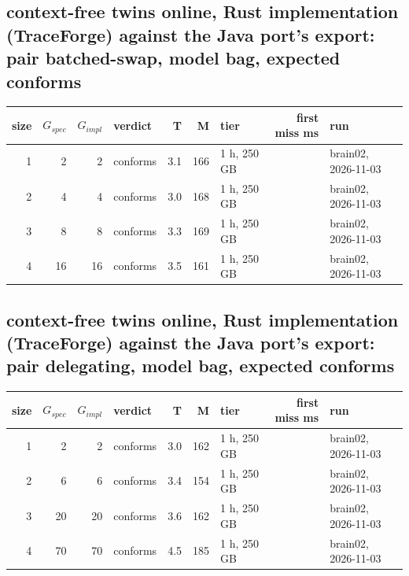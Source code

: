 \documentclass[10pt]{article}
\begin{document}
\subsection*{context-free twins online, Rust implementation (TraceForge) against the Java port's export: pair \textsf{batched-swap}, model bag, expected conforms}
\begin{longtable}{@{}rrrlrrlrl@{}}
\toprule
size & $G_{\mathit{spec}}$ & $G_{\mathit{impl}}$ & verdict & T & M & tier & first miss ms & run \\
\midrule
\endhead
\color{red} 1 & 2 & 2 & conforms & 3.1 & 166 & 1 h, 250 GB &  & brain02, 2026-11-03 \\
\color{red} 2 & 4 & 4 & conforms & 3.0 & 168 & 1 h, 250 GB &  & brain02, 2026-11-03 \\
\color{red} 3 & 8 & 8 & conforms & 3.3 & 169 & 1 h, 250 GB &  & brain02, 2026-11-03 \\
\color{red} 4 & 16 & 16 & conforms & 3.5 & 161 & 1 h, 250 GB &  & brain02, 2026-11-03 \\
\bottomrule
\end{longtable}
\subsection*{context-free twins online, Rust implementation (TraceForge) against the Java port's export: pair \textsf{delegating}, model bag, expected conforms}
\begin{longtable}{@{}rrrlrrlrl@{}}
\toprule
size & $G_{\mathit{spec}}$ & $G_{\mathit{impl}}$ & verdict & T & M & tier & first miss ms & run \\
\midrule
\endhead
\color{red} 1 & 2 & 2 & conforms & 3.0 & 162 & 1 h, 250 GB &  & brain02, 2026-11-03 \\
\color{red} 2 & 6 & 6 & conforms & 3.4 & 154 & 1 h, 250 GB &  & brain02, 2026-11-03 \\
\color{red} 3 & 20 & 20 & conforms & 3.6 & 162 & 1 h, 250 GB &  & brain02, 2026-11-03 \\
\color{red} 4 & 70 & 70 & conforms & 4.5 & 185 & 1 h, 250 GB &  & brain02, 2026-11-03 \\
\bottomrule
\end{longtable}
\end{document}
